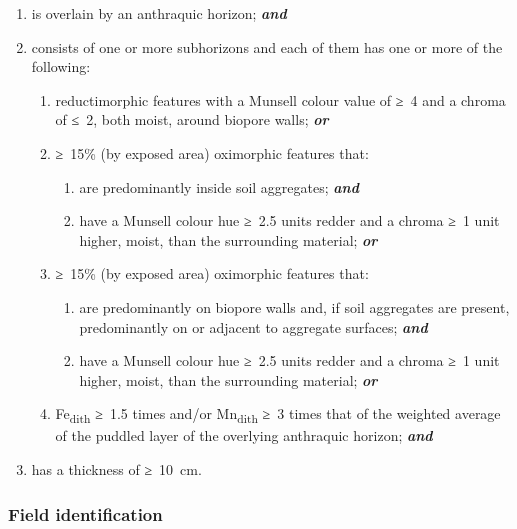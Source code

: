 \documentclass[
  letterpaper,
  DIV=11,
  numbers=noendperiod]{scrreprt}
\providecommand{\tightlist}{%
  \setlength{\itemsep}{0pt}\setlength{\parskip}{0pt}}\usepackage{longtable,booktabs,array}
\begin{document}
\begin{enumerate}
\def\labelenumi{\arabic{enumi}.}
\item
  is overlain by an anthraquic horizon; \textbf{\emph{and}}
\item
  consists of one or more subhorizons and each of them has one or more
  of the following:

  \begin{enumerate}
  \def\labelenumii{\alph{enumii}.}
  \tightlist
  \item
    reductimorphic features with a Munsell colour value of ≥~4 and a
    chroma of ≤~2, both moist, around biopore walls; \textbf{\emph{or}}
  \item
    ≥~15\% (by exposed area) oximorphic features that:

    \begin{enumerate}
    \def\labelenumiii{\roman{enumiii}.}
    \tightlist
    \item
      are predominantly inside soil aggregates; \textbf{\emph{and}}
    \item
      have a Munsell colour hue ≥~2.5 units redder and a chroma ≥~1 unit
      higher, moist, than the surrounding material; \textbf{\emph{or}}
    \end{enumerate}
  \item
    ≥~15\% (by exposed area) oximorphic features that:

    \begin{enumerate}
    \def\labelenumiii{\roman{enumiii}.}
    \tightlist
    \item
      are predominantly on biopore walls and, if soil aggregates are
      present, predominantly on or adjacent to aggregate surfaces;
      \textbf{\emph{and}}
    \item
      have a Munsell colour hue ≥~2.5 units redder and a chroma ≥~1 unit
      higher, moist, than the surrounding material; \textbf{\emph{or}}
    \end{enumerate}
  \item
    Fe\textsubscript{dith} ≥~1.5 times and/or Mn\textsubscript{dith} ≥~3
    times that of the weighted average of the puddled layer of the
    overlying anthraquic horizon; \textbf{\emph{and}}
  \end{enumerate}
\item
  has a thickness of ≥~10~cm.
\end{enumerate}

\hypertarget{field-identification-11}{%
\subsubsection{Field identification}\label{field-identification-11}}
\end{document}
